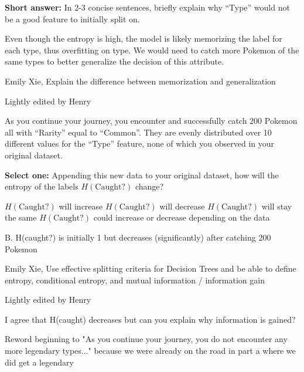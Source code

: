 \begin{parts}
\begin{subparts}
        \subpart[2] \textbf{Short answer:} In 2-3 concise sentences, briefly explain why ``Type'' would not be a good feature to initially split on.
        \fillwithlines{15em}
        \begin{soln}
            Even though the entropy is high, the model is likely memorizing the label for each type, thus overfitting on type. We would need to catch more Pokemon of the same types to better generalize the decision of this attribute.
        \end{soln}
        \begin{qauthor}
            Emily Xie, Explain the difference between memorization and generalization

            Lightly edited by Henry
        \end{qauthor}
        
        As you continue your journey, you encounter and successfully catch 200 Pokemon all with ``Rarity'' equal to ``Common''. They are evenly distributed over 10 different values for the ``Type'' feature, none of which you observed in your original dataset. 
        
        \subpart[2] \textbf{Select one:} Appending this new data to your original dataset, how will the entropy of the labels $H(\text{Caught?})$ change? 
        \begin{checkboxes}
            \choice $H(\text{Caught?})$ will increase
            \choice $H(\text{Caught?})$ will decrease
            \choice $H(\text{Caught?})$ will stay the same
            \choice $H(\text{Caught?})$ could increase or decrease depending on the data
        \end{checkboxes}
        \begin{soln}
            B. H(caught?) is initially 1 but decreases (significantly) after catching 200 Pokemon
        \end{soln}
        \begin{qauthor}
            Emily Xie, Use effective splitting criteria for Decision Trees and be able to define entropy, conditional entropy, and mutual information / information gain

            Lightly edited by Henry
        \end{qauthor}
        \begin{qtester}
            I agree that H(caught) decreases but can you explain why information is gained? 
    
            Reword beginning to "As you continue your journey, you do not encounter any more legendary types..." because we were already on the road in part a where we did get a legendary    
        \end{qtester}


\end{subparts}
\end{parts}
